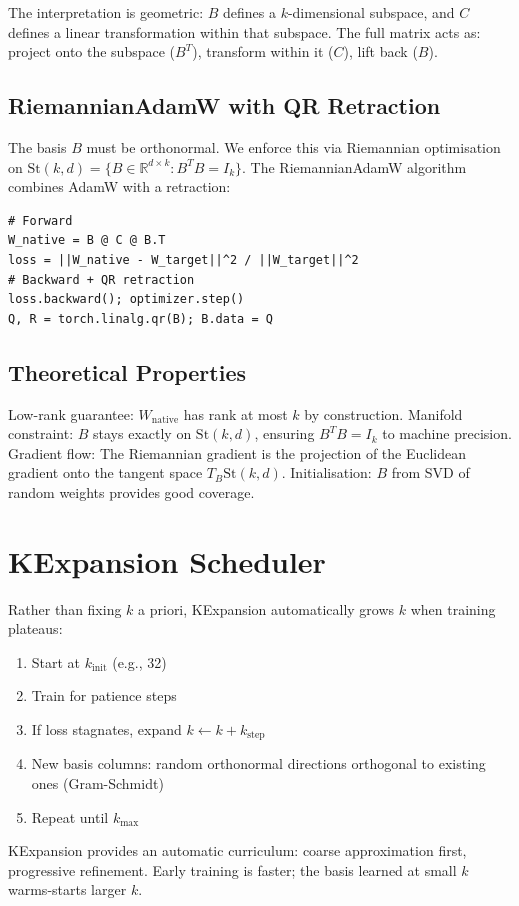 \documentclass[11pt]{article}
\begin{document}
The interpretation is geometric: $B$ defines a $k$-dimensional subspace, and $C$ defines a linear transformation within that subspace. The full matrix acts as: project onto the subspace ($B^T$), transform within it ($C$), lift back ($B$).

\subsection{RiemannianAdamW with QR Retraction}
The basis $B$ must be orthonormal. We enforce this via Riemannian optimisation on $\mathrm{St}(k,d) = \{B \in \mathbb{R}^{d \times k} : B^T B = I_k\}$. The RiemannianAdamW algorithm combines AdamW with a retraction:
\begin{verbatim}
# Forward
W_native = B @ C @ B.T
loss = ||W_native - W_target||^2 / ||W_target||^2
# Backward + QR retraction
loss.backward(); optimizer.step()
Q, R = torch.linalg.qr(B); B.data = Q
\end{verbatim}

\subsection{Theoretical Properties}
Low-rank guarantee: $W_{\mathrm{native}}$ has rank at most $k$ by construction. Manifold constraint: $B$ stays exactly on $\mathrm{St}(k,d)$, ensuring $B^T B = I_k$ to machine precision. Gradient flow: The Riemannian gradient is the projection of the Euclidean gradient onto the tangent space $T_B \mathrm{St}(k,d)$. Initialisation: $B$ from SVD of random weights provides good coverage.


\section{KExpansion Scheduler}
Rather than fixing $k$ a priori, KExpansion automatically grows $k$ when training plateaus:
\begin{enumerate}[nosep]
\item Start at $k_{\mathrm{init}}$ (e.g., 32)
\item Train for patience steps
\item If loss stagnates, expand $k \leftarrow k + k_{\mathrm{step}}$
\item New basis columns: random orthonormal directions orthogonal to existing ones (Gram-Schmidt)
\item Repeat until $k_{\max}$
\end{enumerate}
KExpansion provides an automatic curriculum: coarse approximation first, progressive refinement. Early training is faster; the basis learned at small $k$ warms-starts larger $k$.
\end{document}
